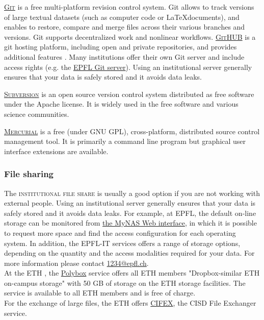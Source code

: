 \vspace{0.4cm}

\noindent {} \textsc{\href{https://git-scm.com/}{Git}} is a free multi-platform revision control system. Git allows to track versions of large textual datasets (such as computer code or \LaTeX documents), and enables to restore, compare and merge files across their various branches and versions. Git supports decentralized work and nonlinear workflows.  \textsc{\href{https://github.com/}{GitHUB}} is a git hosting platform, including open and private repositories, and provides additional features \cite{_git_2015,github_github_2015}. Many institutions offer their own Git server and include access rights (e.g. the \href{http://git.epfl.ch}{EPFL Git server}). Using an institutional server generally ensures that your data is safely stored and it avoids data leaks. 

\vspace{0.4cm}

\noindent {} \textsc{\href{http://subversion.apache.org}{Subversion}} is an open source version control system distributed as free software under the Apache license. It is widely used in the free software and various science communities.

\vspace{0.4cm}

\noindent {} \textsc{\href{https://www.mercurial-scm.org}{Mercurial}} is a free (under GNU GPL), cross-platform, distributed source control management tool. It is primarily a command line program but graphical user interface extensions are available. 

\subsubsection{File sharing}

\noindent The \textsc{institutional file share} is usually a good option if you are not working with external people.  Using an institutional server generally ensures that your data is safely stored and it avoids data leaks. For example, at EPFL, the default on-line storage can be monitored from \href{http://mynas.epfl.ch}{the MyNAS Web interface}, in which it is possible to request more space and find the access configuration for each operating system. In addition, the EPFL-IT services offers a range of storage options, depending on the quantity and the access modalities required for your data. For more information please contact \href{mailto:1234@epfl.ch}{1234@epfl.ch}. \\
At the ETH , the \href{http://polybox.ethz.ch}{Polybox} service offers all ETH members "Dropbox-similar ETH on-campus storage" with 50 GB of storage on the ETH storage facilities. The service is available to all ETH members and is free of charge.\\
For the exchange of large files, the ETH offers \href{http://cifex.ethz.ch}{CIFEX}, the CISD File Exchanger service. 


